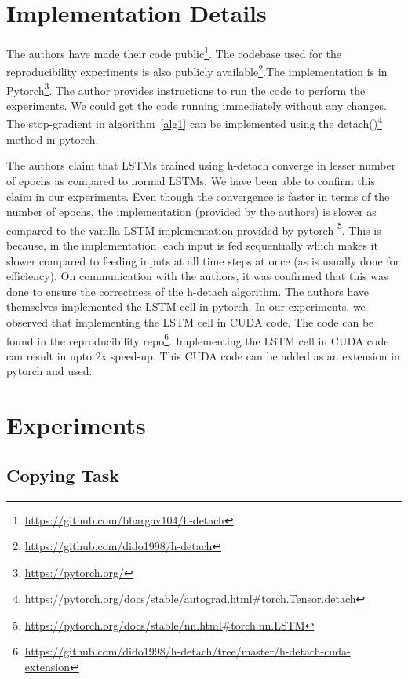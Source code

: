 \section{Implementation Details}

The authors have made their code public\footnote{\url{https://github.com/bhargav104/h-detach}}. The codebase used for the reproducibility experiments is also publicly available\footnote{\url{https://github.com/dido1998/h-detach}}.The implementation is in Pytorch\footnote{\url{https://pytorch.org/}}. The author provides instructions to run the code to perform the experiments. We could get the code running immediately without any changes. The stop-gradient in algorithm~\ref{alg1} can be implemented using the detach()\footnote{\url{https://pytorch.org/docs/stable/autograd.html\#torch.Tensor.detach}} method in pytorch. 

The authors claim that LSTMs trained using h-detach converge in lesser number of epochs as compared to normal LSTMs. We have been able to confirm this claim in our experiments. Even though the convergence is faster in terms of the number of epochs, the implementation (provided by the authors) is slower as compared to the vanilla LSTM implementation provided by pytorch \footnote{\url{https://pytorch.org/docs/stable/nn.html\#torch.nn.LSTM}}. This is because, in the implementation, each input is fed sequentially which makes it slower compared to feeding inputs at all time steps at once (as is usually done for efficiency). On communication with the authors, it was confirmed that this was done to ensure the correctness of the h-detach algorithm. The authors have themselves implemented the LSTM cell in pytorch. In our experiments, we observed that implementing the LSTM cell in CUDA code. The code can be found in the reproducibility repo\footnote{\url{https://github.com/dido1998/h-detach/tree/master/h-detach-cuda-extension}}. Implementing the LSTM cell in CUDA code can result in upto 2x speed-up. This CUDA code can be added as an extension in pytorch and used.



\section{Experiments}
\label{others}

\subsection{Copying Task}

